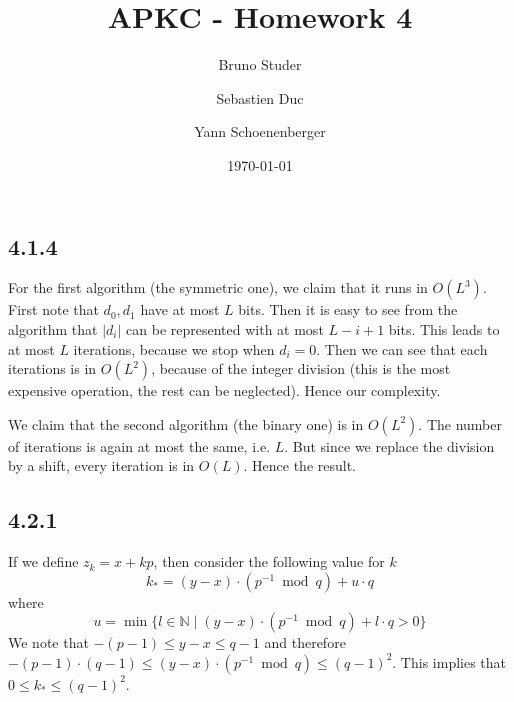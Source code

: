 \documentclass[12pt,a4paper]{article}
\title{APKC - Homework 4}
\author{Bruno Studer \and Sebastien Duc  \and Yann Schoenenberger}
\date{\today}
\begin{document}
\maketitle

\subsection*{4.1.4}
For the first algorithm (the symmetric one), we claim that it runs in $O(L^3)$.
First note that $d_0, d_1$ have at most $L$ bits. Then it is easy to see from the algorithm that $|d_i|$ can be represented with at most $L-i+1$ bits.
This leads to at most $L$ iterations, because we stop when $d_i = 0$.
Then we can see that each iterations is in $O(L^2)$, because of the integer division (this is the most expensive operation, the rest can be neglected).
Hence our complexity.

We claim that the second algorithm (the binary one) is in $O(L^2)$.
The number of iterations is again at most the same, i.e. $L$.
But since we replace the division by a shift, every iteration is in $O(L)$. Hence the result.


\subsection*{4.2.1}
If we define $z_k = x + kp$, then consider the following value for $k$
\[
    k_* = (y-x) \cdot (p^{-1} \bmod q) + u \cdot q 
\]
where 
\[
    u = \min\{ l\in\mathbb{N} \mid (y-x) \cdot (p^{-1} \bmod q) + l \cdot q > 0 \}
\]
We note that $-(p-1) \leq y-x \leq q-1$ and therefore  $-(p-1)\cdot(q-1) \leq (y-x) \cdot (p^{-1} \bmod q) \leq (q-1)^2$.
This implies that $0 \leq k_* \leq (q-1)^2$.
\end{document}
